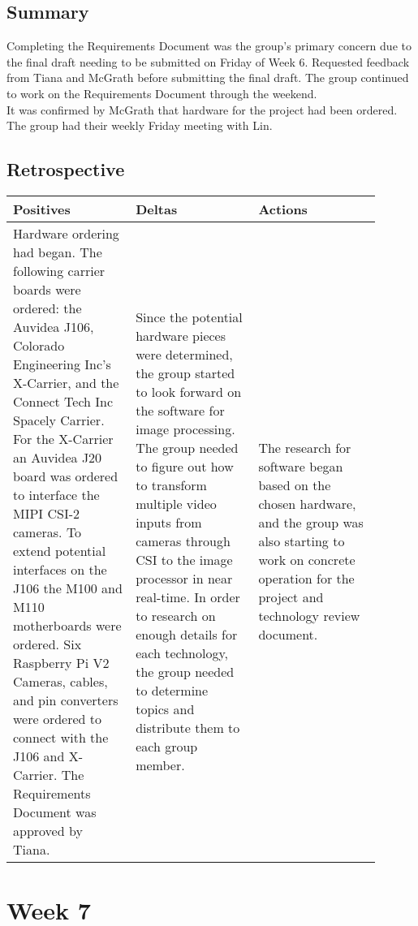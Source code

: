\documentclass[letterpaper,10pt,serif,draftclsnofoot,onecolumn,compsoc,titlepage]{IEEEtran}
\begin{document}
\subsection{Summary}

Completing the Requirements Document was the group's primary concern due to the 
final draft needing to be submitted on Friday of Week 6. Requested feedback 
from Tiana and McGrath before submitting the final draft. The group continued to 
work on the Requirements Document through the weekend. \\

It was confirmed by McGrath that hardware for the project had been ordered. The group 
had their weekly Friday meeting with Lin. \\

\subsection{Retrospective}

\begin{tabular}{|p{0.3\linewidth}|p{0.3\linewidth}|p{0.3\linewidth}|}
   \hline
   \textbf{Positives} & \textbf{Deltas} & \textbf{Actions}\\ 
   \hline
   Hardware ordering had began. The following carrier boards were ordered: the Auvidea 
   J106, Colorado Engineering Inc's X-Carrier, and the Connect Tech Inc Spacely Carrier. 
   For the X-Carrier an Auvidea J20 board was ordered to interface the MIPI CSI-2 
   cameras. To extend potential interfaces on the J106 the M100 and M110 motherboards 
   were ordered. Six Raspberry Pi V2 Cameras, cables, and pin converters were ordered 
   to connect with the J106 and X-Carrier. The Requirements Document was approved by 
   Tiana.
   & 
   Since the potential hardware pieces were determined, the group started to look forward 
   on the software for image processing. 
   The group needed to figure out how to transform multiple video inputs from cameras 
   through CSI to the image processor in near real-time. 
   In order to research on enough details for each technology, the group needed to determine 
   topics and distribute them to each group member.
   & 
   The research for software began based on the chosen hardware, and the group was also 
   starting to work on concrete operation for the project and technology review document. \\
   \hline
\end{tabular}

\section{Week 7}
\end{document}

